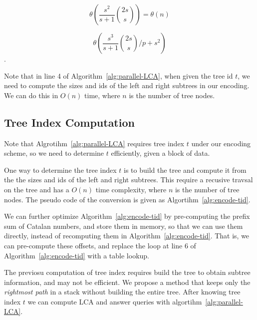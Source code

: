 
\begin{equation} \label{eq:space}
\theta\left(\frac{s^2}{s+1} \binom{2s}{s}\right) =
\theta\left(n\right)
\end{equation}

\begin{equation} \label{eq:parallel-time}
\theta\left(\frac{s^3}{s+1} \binom{2s}{s} \bigg/ p + s^2 \right)
\end{equation}.


Note that in line 4 of Algorithm~\ref{alg:parallel-LCA}, when given
the tree id $t$, we need to compute the sizes and ids of the left and
right subtrees in our encoding.  We can do this in $O(n)$ time, where
$n$ is the number of tree nodes.




\subsection{Tree Index Computation}

Note that Algrotihm~\ref{alg:parallel-LCA} requires tree index $t$
under our encoding scheme, so we need to determine $t$ efficiently,
given a block of data.


One way to determine the tree index $t$ is to build the tree and
compute it from the the sizes and ids of the left and right subtrees.
This require a recusive travsal on the tree and has a $O(n)$ time
complexity, where $n$ is the number of tree nodes.  The pseudo code of
the conversion is given as Algortihm~\ref{alg:encode-tid}.



We can further optimize Algorithm~\ref{alg:encode-tid} by
pre-computing the prefix sum of Catalan numbers, and store them in
memory, so that we can use them directly, instead of recomputing them
in Algorithm~\ref{alg:encode-tid}.  That is, we can pre-compute these
offsets, and replace the loop at line 6 of
Algorithm~\ref{alg:encode-tid} with a table lookup.


The previosu computation of tree index requires build the tree to
obtain subtree information, and may not be efficient.  We propose a
method that keeps only the {\em rightmost path} in a stack without
building the entire tree.  After knowing tree index $t$ we can compute
LCA and answer queries with algortihm~\ref{alg:parallel-LCA}.


